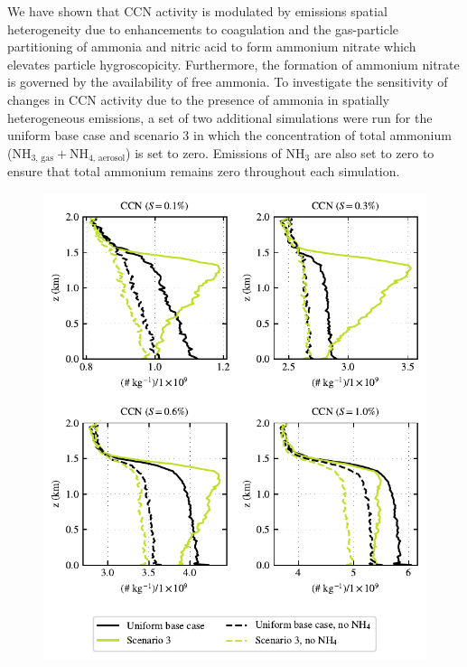 \documentclass[journal abbreviation, manuscript]{copernicus}
\begin{document}
We have shown that CCN activity is modulated by emissions spatial heterogeneity due to enhancements to coagulation and the gas-particle partitioning of ammonia and nitric acid to form ammonium nitrate which elevates particle hygroscopicity. Furthermore, the formation of ammonium nitrate is governed by the availability of free ammonia. To investigate the sensitivity of changes in CCN activity due to the presence of ammonia in spatially heterogeneous emissions, a set of two additional simulations were run for the uniform base case and scenario 3 in which the concentration of total ammonium (NH$_{3\text{, gas}} + $NH$_{4\text{, aerosol}}$) is set to zero. Emissions of NH$_3$ are also set to zero to ensure that total ammonium remains zero throughout each simulation. 

\begin{figure}[!h]
	\centering
	\includegraphics[]{figures/aerosol-ccn-vertical-profiles-no-nh4-cases-time36.pdf}
	\caption{}
	\label{fig:ccn-vertical-profile-no-ammonia}
\end{figure}
\end{document}
